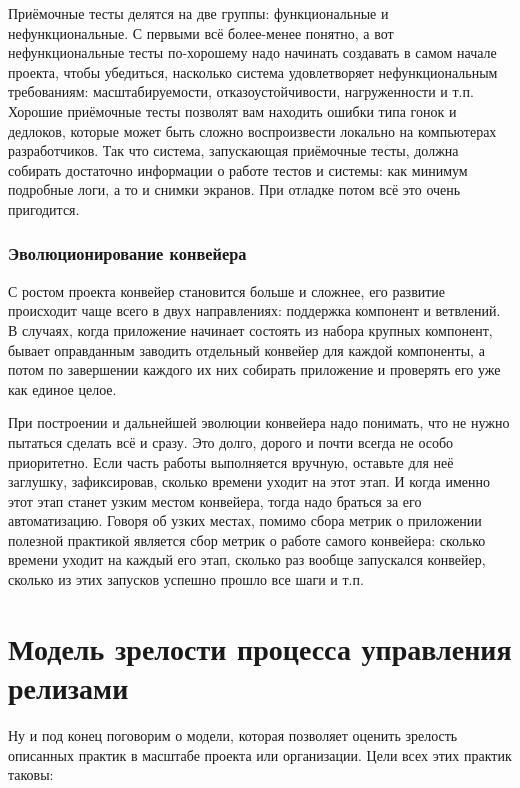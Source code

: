 \documentclass{../../text-style}
\begin{document}
Приёмочные тесты делятся на две группы: функциональные и нефункциональные. С первыми всё более-менее понятно, а вот нефункциональные тесты по-хорошему надо начинать создавать в самом начале проекта, чтобы убедиться, насколько система удовлетворяет нефункциональным требованиям: масштабируемости, отказоустойчивости, нагруженности и т.п. Хорошие приёмочные тесты позволят вам находить ошибки типа гонок и дедлоков, которые может быть сложно воспроизвести локально на компьютерах разработчиков. Так что система, запускающая приёмочные тесты, должна собирать достаточно информации о работе тестов и системы: как минимум подробные логи, а то и снимки экранов. При отладке потом всё это очень пригодится.

\subsubsection{Эволюционирование конвейера}

С ростом проекта конвейер становится больше и сложнее, его развитие происходит чаще всего в двух направлениях: поддержка компонент и ветвлений. В случаях, когда приложение начинает состоять из набора крупных компонент, бывает оправданным заводить отдельный конвейер для каждой компоненты, а потом по завершении каждого их них собирать приложение и проверять его уже как единое целое.

При построении и дальнейшей эволюции конвейера надо понимать, что не нужно пытаться сделать всё и сразу. Это долго, дорого и почти всегда не особо приоритетно. Если часть работы выполняется вручную, оставьте для неё заглушку, зафиксировав, сколько времени уходит на этот этап. И когда именно этот этап станет узким местом конвейера, тогда надо браться за его автоматизацию. Говоря об узких местах, помимо сбора метрик о приложении полезной практикой является сбор метрик о работе самого конвейера: сколько времени уходит на каждый его этап, сколько раз вообще запускался конвейер, сколько из этих запусков успешно прошло все шаги и т.п.

\section{Модель зрелости процесса управления релизами}

Ну и под конец поговорим о модели, которая позволяет оценить зрелость описанных практик в масштабе проекта или организации. Цели всех этих практик таковы:
\end{document}
